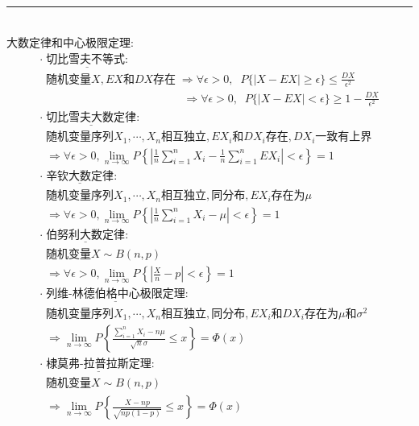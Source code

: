 \documentclass[10pt,UTF8,twocolumn,a4paper]{ctexart}
\begin{document}
    \hrule
    ~\\
     大数定律和中心极限定理:
    $$
    \begin{array}{l}
    \cdot\; \underline{\textbf{切比雪夫不等式:}}
        \\\;\;  随机变量X, EX和DX存在\;\Rightarrow \forall\epsilon>0,\;\; P\{|X-EX|\geq\epsilon\}\leq\frac{DX}{\epsilon^2}    \\[5pt]
        \;\,\qquad\qquad\qquad\qquad\qquad\qquad\;\Rightarrow \forall\epsilon>0,\;\; P\{|X-EX|<\epsilon\}\geq 1-\frac{DX}{\epsilon^2}    \\[5pt]
    \cdot\; \underline{\textbf{切比雪夫大数定律}}:
        \\\;\;  随机变量序列X_1,\cdots,X_n相互独立,EX_i和DX_i存在,DX_i一致有上界
        \\\;\;  \Rightarrow \forall\epsilon>0, \lim\limits_{n\to\infty}P\left\{\left|\frac{1}{n}\sum_{i=1}^nX_i-\frac{1}{n}\sum_{i=1}^nEX_i\right|<\epsilon\right\}=1  \\[12pt]
    \cdot\; \underline{\textbf{辛钦大数定律}}:
        \\\;\;  随机变量序列X_1,\cdots,X_n相互独立,同分布,EX_i存在为\mu
        \\\;\;  \Rightarrow \forall\epsilon>0, \lim\limits_{n\to\infty}P\left\{\left|\frac{1}{n}\sum_{i=1}^nX_i-\mu\right|<\epsilon\right\}=1  \\[12pt]
    \cdot\; \underline{\textbf{伯努利大数定律}}:
        \\\;\;  随机变量X\sim B(n,p)
        \\\;\;  \Rightarrow \forall\epsilon>0, \lim\limits_{n\to\infty}P\left\{\left|\frac{X}{n}-p\right|<\epsilon\right\}=1  \\[12pt]
    \cdot\; \underline{\textbf{列维-林德伯格中心极限定理}}:
        \\\;\;  随机变量序列X_1,\cdots,X_n相互独立,同分布,EX_i和DX_i存在为\mu 和\sigma^2
        \\\;\;  \Rightarrow \lim\limits_{n\to\infty}P\left\{\frac{\sum_{i=1}^nX_i-n\mu}{\sqrt{n}\sigma}\leq x\right\}=\Phi(x)  \\[12pt]
    \cdot\; \underline{\textbf{棣莫弗-拉普拉斯定理}}:
        \\\;\;  随机变量X\sim B(n,p)
        \\\;\;  \Rightarrow \lim\limits_{n\to\infty}P\left\{\frac{X-np}{\sqrt{np(1-p)}}\leq x\right\}=\Phi(x)  \\[12pt]
    \end{array}
    $$
\end{document}
